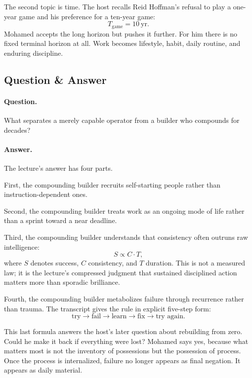 The second topic is time. The host recalls Reid Hoffman's refusal to play a one-year game and his preference for a ten-year game:
\begin{equation}
T_{\text{game}} = 10\ \text{yr}.
\end{equation}
Mohamed accepts the long horizon but pushes it further. For him there is no fixed terminal horizon at all. Work becomes lifestyle, habit, daily routine, and enduring discipline.

\subsection{Question \& Answer}

\paragraph{Question.} What separates a merely capable operator from a builder who compounds for decades?

\paragraph{Answer.} The lecture's answer has four parts.

First, the compounding builder recruits self-starting people rather than instruction-dependent ones.

Second, the compounding builder treats work as an ongoing mode of life rather than a sprint toward a near deadline.

Third, the compounding builder understands that consistency often outruns raw intelligence:
\begin{equation}
S \propto C \cdot T,
\end{equation}
where \(S\) denotes success, \(C\) consistency, and \(T\) duration. This is not a measured law; it is the lecture's compressed judgment that sustained disciplined action matters more than sporadic brilliance.

Fourth, the compounding builder metabolizes failure through recurrence rather than trauma. The transcript gives the rule in explicit five-step form:
\begin{equation}
\text{try} \to \text{fail} \to \text{learn} \to \text{fix} \to \text{try again}.
\end{equation}

This last formula answers the host's later question about rebuilding from zero. Could he make it back if everything were lost? Mohamed says yes, because what matters most is not the inventory of possessions but the possession of process. Once the process is internalized, failure no longer appears as final negation. It appears as daily material.


